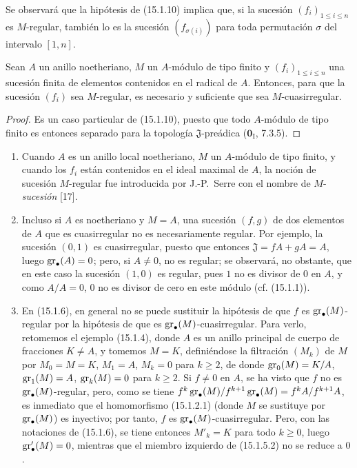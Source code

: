 Se observará que la hipótesis de (15.1.10) implica que, si la sucesión
$(f_i)_{1\leq i\leq n}$ es $M$-regular, también lo es la sucesión
$(f_{\sigma(i)})$ para toda permutación $\sigma$ del intervalo $[1,n]$.

\begin{corollary}[15.1.11]
\label{0.15.1.11-fr}
Sean $A$ un anillo noetheriano, $M$ un $A$-módulo de tipo finito y
$(f_i)_{1\leq i\leq n}$ una sucesión finita de elementos contenidos en el
\textup{radical} de $A$. Entonces, para que la sucesión $(f_i)$ sea $M$-regular, es
necesario y suficiente que sea $M$-cuasirregular.
\end{corollary}

\begin{proof}
Es un caso particular de (15.1.10), puesto que todo $A$-módulo de tipo finito
es entonces separado para la topología $\mathfrak{J}$-preádica
($\mathbf{0}_{\mathrm I}$, 7.3.5).
\end{proof}

\begin{remarks}[15.1.12]
\label{0.15.1.12-fr}
\mbox{}
\begin{enumerate}
  \item[(i)] Cuando $A$ es un anillo local noetheriano, $M$ un $A$-módulo de
  tipo finito, y cuando los $f_i$ están contenidos en el ideal maximal de $A$,
  la noción de sucesión $M$-regular fue introducida por J.-P.~Serre con el
  nombre de $M$-\emph{sucesión} [17].
  \item[(ii)] Incluso si $A$ es noetheriano y $M=A$, una sucesión $(f,g)$ de
  dos elementos de $A$ que es cuasirregular no es necesariamente regular. Por
  ejemplo, la sucesión $(0,1)$ es cuasirregular, puesto que entonces
  $\mathfrak{J}=fA+gA=A$, luego $\operatorname{gr}_\bullet(A)=0$; pero, si $A\neq0$, no es
  regular; se observará, no obstante, que en este caso la sucesión $(1,0)$ es
  regular, pues $1$ no es divisor de $0$ en $A$, y como $A/A=0$, $0$ no es
  divisor de cero en este módulo (cf. (15.1.1)).
  \item[(iii)]
  En (15.1.6), en general no se puede sustituir la hipótesis de que $f$ es
  $\operatorname{gr}_\bullet(M)$-regular por la hipótesis de que es
  $\operatorname{gr}_\bullet(M)$-cuasirregular. Para verlo, retomemos el ejemplo (15.1.4),
  donde $A$ es un anillo principal de cuerpo de fracciones $K\neq A$, y
  tomemos $M=K$, definiéndose la filtración $(M_k)$ de $M$ por
  $M_0=M=K$, $M_1=A$, $M_k=0$ para $k\geq2$, de donde
  $\operatorname{gr}_0(M)=K/A$, $\operatorname{gr}_1(M)=A$, $\operatorname{gr}_k(M)=0$ para $k\geq2$. Si $f\neq0$ en
  $A$, se ha visto que $f$ no es $\operatorname{gr}_\bullet(M)$-regular, pero, como se tiene
  $f^k\operatorname{gr}_\bullet(M)/f^{k+1}\operatorname{gr}_\bullet(M)=f^kA/f^{k+1}A$,
  es inmediato que el homomorfismo (15.1.2.1) (donde $M$ se sustituye por
  $\operatorname{gr}_\bullet(M)$) es inyectivo; por tanto, $f$ es
  $\operatorname{gr}_\bullet(M)$-cuasirregular. Pero, con las notaciones de (15.1.6), se
  tiene entonces $M'_k=K$ para todo $k\geq0$, luego
  $\operatorname{gr}'_\bullet(M)=0$, mientras que el miembro izquierdo de (15.1.5.2) no se
  reduce a $0$.
\end{enumerate}
\end{remarks}

